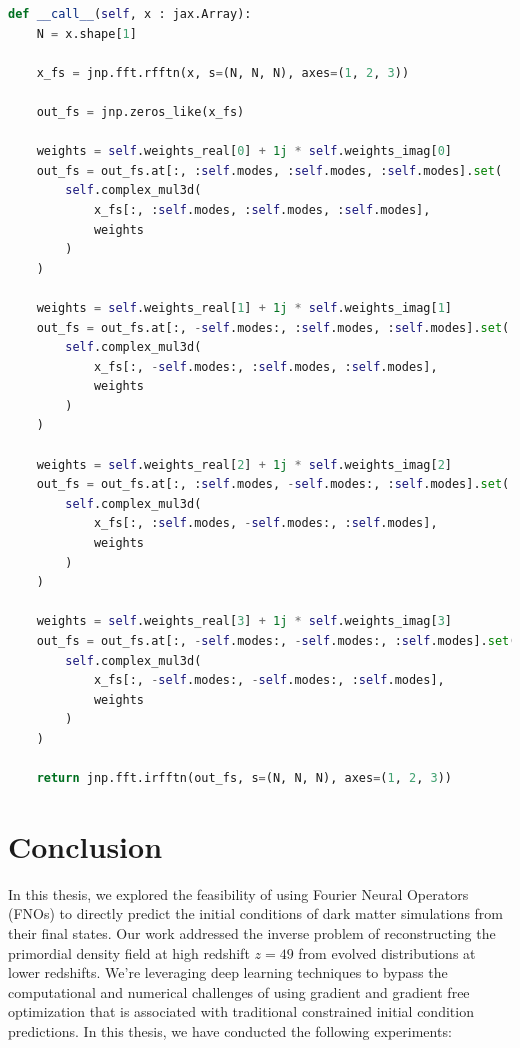 \documentclass{article}
\begin{document}
{\begin{lstlisting}[language=Python]
 def __call__(self, x : jax.Array):
    N = x.shape[1]

    x_fs = jnp.fft.rfftn(x, s=(N, N, N), axes=(1, 2, 3))

    out_fs = jnp.zeros_like(x_fs)

    weights = self.weights_real[0] + 1j * self.weights_imag[0]
    out_fs = out_fs.at[:, :self.modes, :self.modes, :self.modes].set(
        self.complex_mul3d(
            x_fs[:, :self.modes, :self.modes, :self.modes],
            weights
        )
    )
    
    weights = self.weights_real[1] + 1j * self.weights_imag[1]
    out_fs = out_fs.at[:, -self.modes:, :self.modes, :self.modes].set(
        self.complex_mul3d(
            x_fs[:, -self.modes:, :self.modes, :self.modes],
            weights
        )
    )
    
    weights = self.weights_real[2] + 1j * self.weights_imag[2]
    out_fs = out_fs.at[:, :self.modes, -self.modes:, :self.modes].set(
        self.complex_mul3d(
            x_fs[:, :self.modes, -self.modes:, :self.modes], 
            weights
        )
    )
    
    weights = self.weights_real[3] + 1j * self.weights_imag[3]
    out_fs = out_fs.at[:, -self.modes:, -self.modes:, :self.modes].set(
        self.complex_mul3d(
            x_fs[:, -self.modes:, -self.modes:, :self.modes], 
            weights
        )
    )

    return jnp.fft.irfftn(out_fs, s=(N, N, N), axes=(1, 2, 3))
\end{lstlisting}




\newpage
\section{Conclusion}

In this thesis, we explored the feasibility of using Fourier Neural Operators (FNOs) to directly predict the initial conditions of dark matter simulations from their final states. Our work addressed the inverse problem of reconstructing the primordial density field at high redshift $z=49$ from evolved distributions at lower redshifts. We're leveraging deep learning techniques to bypass the computational and numerical challenges of using gradient and gradient free optimization that is associated with traditional constrained initial condition predictions. In this thesis, we have conducted the following experiments:

}
\end{document}
